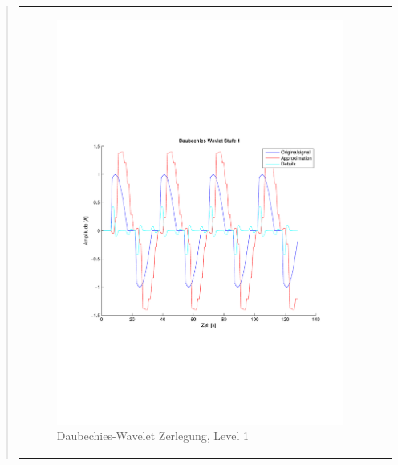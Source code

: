 \begin{quote}
\begin{center}
\begin{tabular}{ll}
\begin{minipage}{0.6\textwidth}
                    \end{minipage}
                    \begin{minipage}{0.6\textwidth}
    
                        \begin{figure}[H]
                            \label{fig:}
                            \includegraphics[scale=0.4, trim = 2cm 6cm 1cm
                            7.5cm,
                            clip]{./Bilder/Termin8/Daubechies_Wavlet_lvl_1}
                            \caption{Daubechies-Wavelet Zerlegung, Level 1}
                        \end{figure}
                    \vspace{-1.5em}
    
                    \end{minipage}
    

\end{tabular}
\end{center}
\end{quote}
